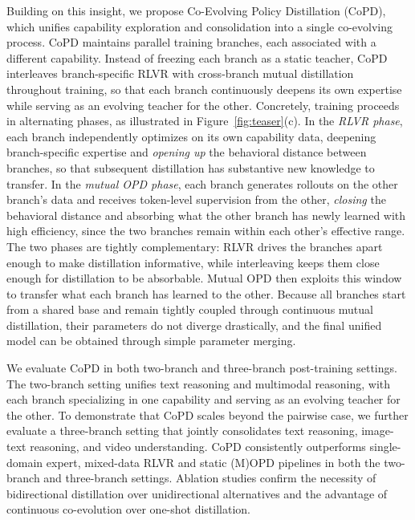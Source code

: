 \documentclass{llmxive}
\begin{document}
Building on this insight, we propose Co-Evolving Policy Distillation (CoPD), which unifies capability exploration and consolidation into a single co-evolving process. CoPD maintains parallel training branches, each associated with a different capability. Instead of freezing each branch as a static teacher, CoPD interleaves branch-specific RLVR with cross-branch mutual distillation throughout training, so that each branch continuously deepens its own expertise while serving as an evolving teacher for the other.
Concretely, training proceeds in alternating phases, as illustrated in Figure~\ref{fig:teaser}(c). In the \textit{RLVR phase}, each branch independently optimizes on its own capability data, deepening branch-specific expertise and \textit{opening up} the behavioral distance between branches, so that subsequent distillation has substantive new knowledge to transfer. In the \textit{mutual OPD phase}, each branch generates rollouts on the other branch's data and receives token-level supervision from the other, \textit{closing} the behavioral distance and absorbing what the other branch has newly learned with high efficiency, since the two branches remain within each other's effective range. 
The two phases are tightly complementary: RLVR drives the branches apart enough to make distillation informative, while interleaving keeps them close enough for distillation to be absorbable. Mutual OPD then exploits this window to transfer what each branch has learned to the other.
Because all branches start from a shared base and remain tightly coupled through continuous mutual distillation, their parameters do not diverge drastically, and the final unified model can be obtained through simple parameter merging.


We evaluate CoPD in both two-branch and three-branch post-training settings. The two-branch setting unifies text reasoning and multimodal reasoning, with each branch specializing in one capability and serving as an evolving teacher for the other. To demonstrate that CoPD scales beyond the pairwise case, we further evaluate a three-branch setting that jointly consolidates text reasoning, image-text reasoning, and video understanding.
CoPD consistently outperforms single-domain expert, mixed-data RLVR and static (M)OPD pipelines in both the two-branch and three-branch settings. Ablation studies confirm the necessity of bidirectional distillation over unidirectional alternatives and the advantage of continuous co-evolution over one-shot distillation.
\end{document}
